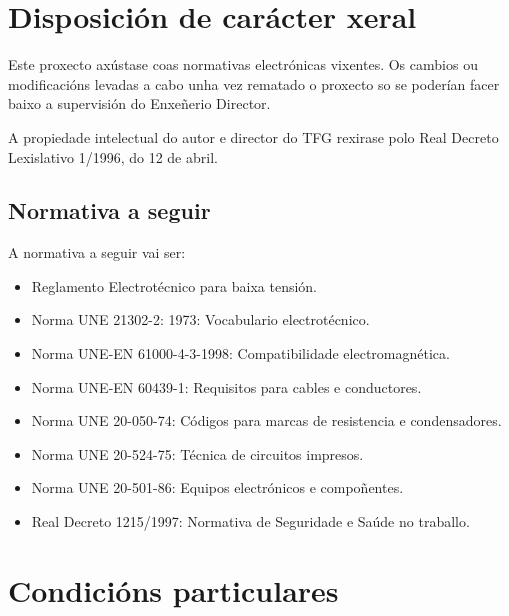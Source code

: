 \documentclass[11pt,twoside]{book}
\begin{document}
\chapter{Disposición de carácter xeral}

Este proxecto axústase coas normativas electrónicas vixentes. Os cambios ou modificacións levadas a cabo unha vez rematado o proxecto so se poderían facer baixo a supervisión do Enxeñerio Director.

A propiedade intelectual do autor e director do TFG rexirase polo Real Decreto Lexislativo 1/1996, do 12 de abril.

\section{Normativa a seguir}
A normativa a seguir vai ser:
\begin{itemize}
    \item Reglamento Electrotécnico para baixa tensión.
    \item Norma UNE 21302-2: 1973: Vocabulario electrotécnico.
    \item Norma UNE-EN 61000-4-3-1998: Compatibilidade electromagnética.
    \item Norma UNE-EN 60439-1: Requisitos para cables e conductores.
    \item Norma UNE 20-050-74: Códigos para marcas de resistencia e condensadores.
    \item Norma UNE 20-524-75: Técnica de circuitos impresos.
    \item Norma UNE 20-501-86: Equipos electrónicos e compoñentes.
    \item Real Decreto 1215/1997: Normativa de Seguridade e Saúde no traballo.
\end{itemize}

\chapter{Condicións particulares}
\end{document}
